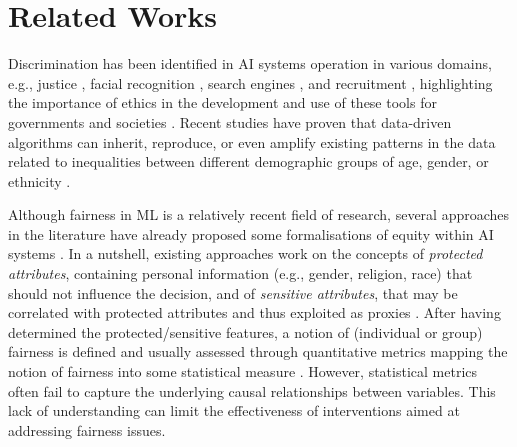 \documentclass[letterpaper]{article} %
\begin{document}
\section{Related Works}

Discrimination has been identified in AI systems operation in various domains, e.g., justice \cite{ProPublica2}, facial recognition \cite{pmlr-v81-buolamwini18a}, search engines \cite{10.1145/2702123.2702520}, and recruitment \cite{Leicht-Deobald}, highlighting the importance of ethics in the development and use of these tools for governments and societies \cite{act1964civil}.
Recent studies have proven that data-driven algorithms can inherit, reproduce, or even amplify existing patterns in the data related to inequalities between different demographic groups of age, gender, or ethnicity \cite{chouldechova2018frontiers,10.1145/2090236.2090255}. 

Although fairness in ML \cite{Barocas2018FairnessAM} is a relatively recent field of research, several approaches in the literature have already proposed some formalisations of equity within AI systems \cite{wang2022brief,10.1145/3494672}.
%
In a nutshell, existing approaches work on the concepts of \emph{protected attributes}, containing personal information (e.g., gender, religion, race) that should not influence the decision, and of \emph{sensitive attributes}, that may be correlated with protected attributes and thus exploited as proxies \cite{QuyRIZN22,NuenenASC20,Wiggins2020calculating}.
%
After having determined the protected/sensitive features, a notion of (individual or group) fairness is defined and usually assessed through quantitative metrics mapping the notion of fairness into some statistical measure \cite[e.g., disparate impact, equal opportunity; see][for further details]{wang2022brief}. However, statistical metrics often fail to capture the underlying causal relationships between variables. 
This lack of understanding can limit the effectiveness of interventions aimed at addressing fairness issues. 
\end{document}
